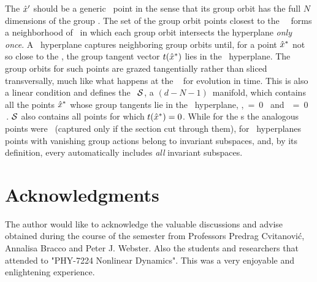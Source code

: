     \ifboyscout
The {\template} ${\hat{x}'}$ should be a generic \statesp\ point in the
sense that its group orbit has the full $N$ dimensions of the group
\Group. The set of the group orbit points {closest} to the
\template\ \slicep\ forms a neighborhood of \slicep\ in which each group
orbit intersects the hyperplane \emph{only once}. A \slice\ hyperplane
captures neighboring group orbits until, for a point $\hat{x}^\ast$ not so
close to the \template, the group tangent vector $t(\hat{x}^\ast)$ lies in
the \slice\ hyperplane. The group orbits for such points are grazed
tangentially rather than sliced transversally, much like what happens at
the \poincBord\  for evolution in time.
This is also a linear condition and defines the \chartBord\ ${\cal
S}$, a $(d\!-\!N\!-1)$\dmn\ manifold, which contains
all the points $\hat{x}^\ast$ whose group tangents lie in the \slice\
hyperplane, \ie,
\beq
\braket{\sspRSing}{\sliceTan{}} \,=\, 0
      \mbox{ and }
\braket{\groupTan(\sspRSing)}{\sliceTan{}} \,=\, 0
\,.
\label{sliceSingl0}
\eeq
${\cal S}$ also contains all points for which $t(\hat{x}^\ast)=0$.
While for the \PoincSec s \refeq{eq:sspRSing} the analogous points were
\eqva\ (captured only if the section cut through them), for \slice\
hyperplanes points with vanishing group actions belong to invariant
subspaces, and, by its definition, every {\chartBord} automatically
includes \emph{all} invariant subspaces.
    \fi %

\section{Acknowledgments}
The author would like to acknowledge the valuable discussions and advise obtained during the course of the semester from Professors Predrag Cvitanovi{\'c}, Annalisa Bracco and Peter J. Webster. Also the students and researchers that attended to "PHY-7224 Nonlinear Dynamics". This was a very enjoyable and enlightening experience.
